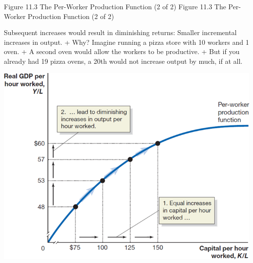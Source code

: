 \documentclass[
  12pt,
  ignorenonframetext,
]{beamer}
\begin{document}
\begin{frame}{Figure 11.3 The Per-Worker Production Function (2 of 2)}
\protect\hypertarget{figure-11.3-the-per-worker-production-function-2-of-2}{}
Figure 11.3 The Per-Worker Production Function (2 of 2)

Subsequent increases would result in diminishing returns: Smaller
incremental increases in output. + Why? Imagine running a pizza store
with 10 workers and 1 oven. + A second oven would allow the workers to
be productive. + But if you already had 19 pizza ovens, a 20th would not
increase output by much, if at all.

\includegraphics[width=\textwidth,height=0.99\textheight]{imgs3/img_slide19a.png}
\end{frame}
\end{document}
